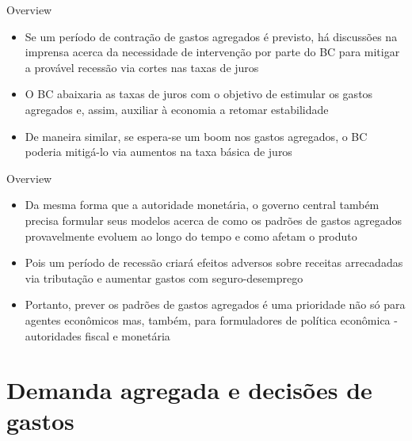 \documentclass[10pt]{beamer}
\begin{document}
\begin{frame}{Overview}
    \begin{itemize}
        \item Se um período de contração de gastos agregados é previsto, há discussões na imprensa acerca da necessidade de intervenção por parte do BC para mitigar a provável recessão via cortes nas taxas de juros\bigskip
         
        \item O BC abaixaria as taxas de juros com o objetivo de estimular os gastos agregados e, assim, auxiliar à economia a retomar estabilidade\bigskip
         
        \item De maneira similar, se espera-se um boom nos gastos agregados, o BC poderia mitigá-lo via aumentos na taxa básica de juros
    \end{itemize}
\end{frame}

\begin{frame}{Overview}
    \begin{itemize}
        \item Da mesma forma que a autoridade monetária, o governo central também precisa formular seus modelos acerca de como os padrões de gastos agregados provavelmente evoluem ao longo do tempo e como afetam o produto\bigskip
         
        \item Pois um período de recessão criará efeitos adversos sobre receitas arrecadadas via tributação e aumentar gastos com seguro-desemprego\bigskip
         
        \item Portanto, prever os padrões de gastos agregados é uma prioridade não só para agentes econômicos mas, também, para formuladores de política econômica - autoridades fiscal e monetária
    \end{itemize}
    
\end{frame}

\section{Demanda agregada e decisões de gastos}
\end{document}
